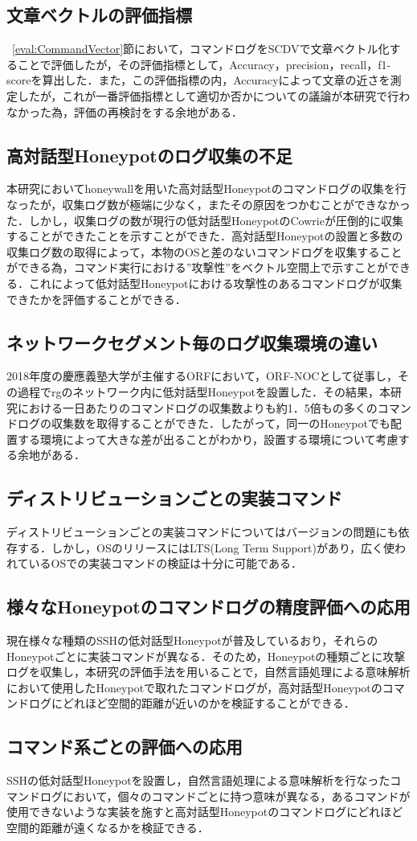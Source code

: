 \subsection{文章ベクトルの評価指標}

~\ref{eval:CommandVector}節において，コマンドログをSCDVで文章ベクトル化することで評価したが，その評価指標として，Accuracy，precision，recall，f1-scoreを算出した．また，この評価指標の内，Accuracyによって文章の近さを測定したが，これが一番評価指標として適切か否かについての議論が本研究で行わなかった為，評価の再検討をする余地がある．

\subsection{高対話型Honeypotのログ収集の不足}
本研究においてhoneywallを用いた高対話型Honeypotのコマンドログの収集を行なったが，収集ログ数が極端に少なく，またその原因をつかむことができなかった．しかし，収集ログの数が現行の低対話型HoneypotのCowrieが圧倒的に収集することができたことを示すことができた．高対話型Honeypotの設置と多数の収集ログ数の取得によって，本物のOSと差のないコマンドログを収集することができる為，コマンド実行における”攻撃性”をベクトル空間上で示すことができる．これによって低対話型Honeypotにおける攻撃性のあるコマンドログが収集できたかを評価することができる．

\subsection{ネットワークセグメント毎のログ収集環境の違い}
2018年度の慶應義塾大学が主催するORFにおいて，ORF-NOCとして従事し，その過程でrgのネットワーク内に低対話型Honeypotを設置した．その結果，本研究における一日あたりのコマンドログの収集数よりも約1．5倍もの多くのコマンドログの収集数を取得することができた．したがって，同一のHoneypotでも配置する環境によって大きな差が出ることがわかり，設置する環境について考慮する余地がある．

\subsection{ディストリビューションごとの実装コマンド}
ディストリビューションごとの実装コマンドについてはバージョンの問題にも依存する．しかし，OSのリリースにはLTS(Long Term Support)があり，広く使われているOSでの実装コマンドの検証は十分に可能である．

\subsection{様々なHoneypotのコマンドログの精度評価への応用}
現在様々な種類のSSHの低対話型Honeypotが普及しているおり，それらのHoneypotごとに実装コマンドが異なる．そのため，Honeypotの種類ごとに攻撃ログを収集し，本研究の評価手法を用いることで，自然言語処理による意味解析において使用したHoneypotで取れたコマンドログが，高対話型Honeypotのコマンドログにどれほど空間的距離が近いのかを検証することができる．

\subsection{コマンド系ごとの評価への応用}
SSHの低対話型Honeypotを設置し，自然言語処理による意味解析を行なったコマンドログにおいて，個々のコマンドごとに持つ意味が異なる，あるコマンドが使用できないような実装を施すと高対話型Honeypotのコマンドログにどれほど空間的距離が遠くなるかを検証できる．
